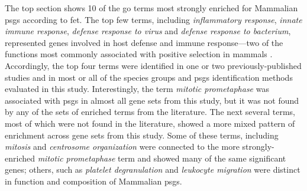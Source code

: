 The top section shows 10 of the \ac{go} terms most strongly enriched
for Mammalian \psgefive \acp{psg} according to \ac{fet}. The top few
terms, including \emph{inflammatory response}, \emph{innate immune
  response}, \emph{defense response to virus} and \emph{defense
  response to bacterium}, represented genes involved in host defense
and immune response---two of the functions most commonly associated
with positive selection in mammals \citep{Nielsen2005b}. Accordingly,
the top four terms were identified in one or two previously-published
studies and in most or all of the species groups and \acp{psg}
identification methods evaluated in this study. Interestingly, the term
\emph{mitotic prometaphase} was associated with \acp{psg} in almost
all gene sets from this study, but it was not found by any of the sets
of enriched terms from the literature. The next several terms, most of
which were not found in the literature, showed a more mixed pattern of
enrichment across gene sets from this study. Some of these terms,
including \emph{mitosis} and \emph{centrosome organization} were
connected to the more strongly-enriched \emph{mitotic prometaphase}
term and showed many of the same significant genes; others, such as
\emph{platelet degranulation} and \emph{leukocyte migration} were
distinct in function and composition of Mammalian \psgefive \acp{psg}.

